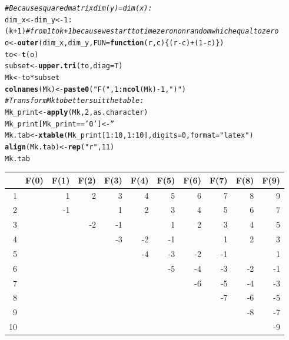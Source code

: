 \documentclass{article}\usepackage[]{graphicx}\usepackage[]{color}
\makeatletter
\newcommand{\hlnum}[1]{\textcolor[rgb]{0.686,0.059,0.569}{#1}}%
\newcommand{\hlstr}[1]{\textcolor[rgb]{0.192,0.494,0.8}{#1}}%
\newcommand{\hlcom}[1]{\textcolor[rgb]{0.678,0.584,0.686}{\textit{#1}}}%
\newcommand{\hlopt}[1]{\textcolor[rgb]{0,0,0}{#1}}%
\newcommand{\hlstd}[1]{\textcolor[rgb]{0.345,0.345,0.345}{#1}}%
\newcommand{\hlkwa}[1]{\textcolor[rgb]{0.161,0.373,0.58}{\textbf{#1}}}%
\newcommand{\hlkwb}[1]{\textcolor[rgb]{0.69,0.353,0.396}{#1}}%
\newcommand{\hlkwc}[1]{\textcolor[rgb]{0.333,0.667,0.333}{#1}}%
\newcommand{\hlkwd}[1]{\textcolor[rgb]{0.737,0.353,0.396}{\textbf{#1}}}%
\newenvironment{kframe}{%
 \def\at@end@of@kframe{}%
 \ifinner\ifhmode%
  \def\at@end@of@kframe{\end{minipage}}%
  \begin{minipage}{\columnwidth}%
 \fi\fi%
 \def\FrameCommand##1{\hskip\@totalleftmargin \hskip-\fboxsep
 \colorbox{shadecolor}{##1}\hskip-\fboxsep
     \hskip-\linewidth \hskip-\@totalleftmargin \hskip\columnwidth}%
 \MakeFramed {\advance\hsize-\width
   \@totalleftmargin\z@ \linewidth\hsize
   \@setminipage}}%
 {\par\unskip\endMakeFramed%
 \at@end@of@kframe}
\makeatother
\begin{document}
\begin{kframe}
\begin{alltt}
\hlcom{# Because squared matrix dim(y) = dim(x):}
\hlstd{dim_x} \hlkwb{<-} \hlstd{dim_y} \hlkwb{<-} \hlnum{1}\hlopt{:}\hlstd{(k} \hlopt{+} \hlnum{1}\hlstd{)} \hlcom{# from 1 to k+1 because we start to time zero nonrandom which equal to zero}
\hlstd{o} \hlkwb{<-} \hlkwd{outer}\hlstd{(dim_x, dim_y,} \hlkwc{FUN}\hlstd{=}\hlkwa{function}\hlstd{(}\hlkwc{r}\hlstd{,}\hlkwc{c}\hlstd{)\{(r}\hlopt{-}\hlstd{c)} \hlopt{+} \hlstd{(}\hlnum{1}\hlopt{-}\hlstd{c)\} )}
\hlstd{to} \hlkwb{<-} \hlkwd{t}\hlstd{(o)}
\hlstd{subset} \hlkwb{<-} \hlkwd{upper.tri}\hlstd{(to,} \hlkwc{diag} \hlstd{= T)}
\hlstd{Mk} \hlkwb{<-} \hlstd{to} \hlopt{*} \hlstd{subset}
\hlkwd{colnames}\hlstd{(Mk)} \hlkwb{<-} \hlkwd{paste0}\hlstd{(}\hlstr{"F("}\hlstd{,} \hlnum{1}\hlopt{:}\hlkwd{ncol}\hlstd{(Mk)} \hlopt{-} \hlnum{1}\hlstd{,} \hlstr{")"}\hlstd{)}
\hlcom{# Transform Mk to better suit the table:}
\hlstd{Mk_print} \hlkwb{<-} \hlkwd{apply}\hlstd{(Mk,} \hlnum{2}\hlstd{, as.character)}
\hlstd{Mk_print[Mk_print} \hlopt{==} \hlstr{'0'}\hlstd{]} \hlkwb{<-} \hlstr{''}
\hlstd{Mk.tab} \hlkwb{<-} \hlkwd{xtable}\hlstd{(Mk_print[}\hlnum{1}\hlopt{:}\hlnum{10}\hlstd{,} \hlnum{1}\hlopt{:}\hlnum{10}\hlstd{],} \hlkwc{digits} \hlstd{=} \hlnum{0}\hlstd{,} \hlkwc{format} \hlstd{=} \hlstr{"latex"}\hlstd{)}
\hlkwd{align}\hlstd{(Mk.tab)} \hlkwb{<-} \hlkwd{rep}\hlstd{(}\hlstr{"r"}\hlstd{,} \hlnum{11}\hlstd{)}
\hlstd{Mk.tab}
\end{alltt}
\end{kframe}%
\begin{table}[ht]
\centering
\begin{tabular}{rrrrrrrrrrr}
  \hline
 & F(0) & F(1) & F(2) & F(3) & F(4) & F(5) & F(6) & F(7) & F(8) & F(9) \\ 
  \hline
1 &  & 1 & 2 & 3 & 4 & 5 & 6 & 7 & 8 & 9 \\ 
  2 &  & -1 &  & 1 & 2 & 3 & 4 & 5 & 6 & 7 \\ 
  3 &  &  & -2 & -1 &  & 1 & 2 & 3 & 4 & 5 \\ 
  4 &  &  &  & -3 & -2 & -1 &  & 1 & 2 & 3 \\ 
  5 &  &  &  &  & -4 & -3 & -2 & -1 &  & 1 \\ 
  6 &  &  &  &  &  & -5 & -4 & -3 & -2 & -1 \\ 
  7 &  &  &  &  &  &  & -6 & -5 & -4 & -3 \\ 
  8 &  &  &  &  &  &  &  & -7 & -6 & -5 \\ 
  9 &  &  &  &  &  &  &  &  & -8 & -7 \\ 
  10 &  &  &  &  &  &  &  &  &  & -9 \\ 
   \hline
\end{tabular}
\end{table}

 
           
\end{document}
